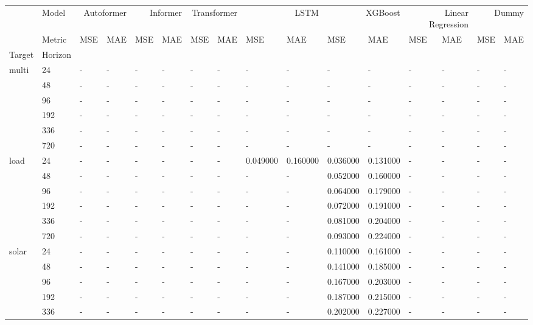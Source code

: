 \begin{tabular}{llllllllllllllll}
\toprule
 & Model & \multicolumn{2}{r}{Autoformer} & \multicolumn{2}{r}{Informer} & \multicolumn{2}{r}{Transformer} & \multicolumn{2}{r}{LSTM} & \multicolumn{2}{r}{XGBoost} & \multicolumn{2}{r}{Linear Regression} & \multicolumn{2}{r}{Dummy} \\
 & Metric & MSE & MAE & MSE & MAE & MSE & MAE & MSE & MAE & MSE & MAE & MSE & MAE & MSE & MAE \\
Target & Horizon &  &  &  &  &  &  &  &  &  &  &  &  &  &  \\
\midrule
\multirow[t]{6}{*}{multi} & 24 & - & - & - & - & - & - & - & - & - & - & - & - & - & - \\
 & 48 & - & - & - & - & - & - & - & - & - & - & - & - & - & - \\
 & 96 & - & - & - & - & - & - & - & - & - & - & - & - & - & - \\
 & 192 & - & - & - & - & - & - & - & - & - & - & - & - & - & - \\
 & 336 & - & - & - & - & - & - & - & - & - & - & - & - & - & - \\
 & 720 & - & - & - & - & - & - & - & - & - & - & - & - & - & - \\
\cline{1-16}
\multirow[t]{6}{*}{load} & 24 & - & - & - & - & - & - & 0.049000 & 0.160000 & 0.036000 & 0.131000 & - & - & - & - \\
 & 48 & - & - & - & - & - & - & - & - & 0.052000 & 0.160000 & - & - & - & - \\
 & 96 & - & - & - & - & - & - & - & - & 0.064000 & 0.179000 & - & - & - & - \\
 & 192 & - & - & - & - & - & - & - & - & 0.072000 & 0.191000 & - & - & - & - \\
 & 336 & - & - & - & - & - & - & - & - & 0.081000 & 0.204000 & - & - & - & - \\
 & 720 & - & - & - & - & - & - & - & - & 0.093000 & 0.224000 & - & - & - & - \\
\cline{1-16}
\multirow[t]{6}{*}{solar} & 24 & - & - & - & - & - & - & - & - & 0.110000 & 0.161000 & - & - & - & - \\
 & 48 & - & - & - & - & - & - & - & - & 0.141000 & 0.185000 & - & - & - & - \\
 & 96 & - & - & - & - & - & - & - & - & 0.167000 & 0.203000 & - & - & - & - \\
 & 192 & - & - & - & - & - & - & - & - & 0.187000 & 0.215000 & - & - & - & - \\
 & 336 & - & - & - & - & - & - & - & - & 0.202000 & 0.227000 & - & - & - & - \\

\end{tabular}
